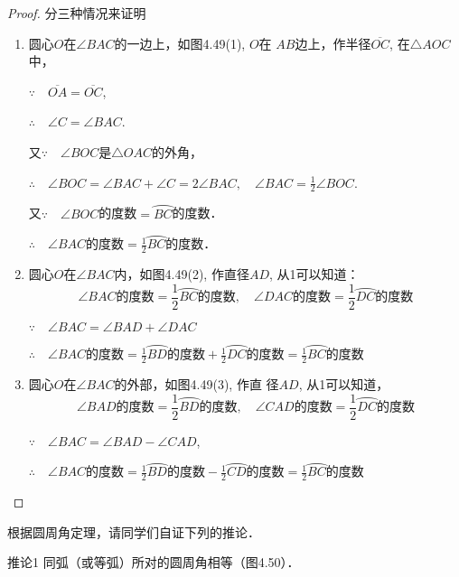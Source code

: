 \begin{proof}
分三种情况来证明
\begin{enumerate}
\item 圆心$O$在$\angle BAC$的一边上，如图4.49(1), $O$在
$AB$边上，作半径$\overline{OC}$, 在$\triangle AOC$中，

$\because \quad \overline{OA}=\overline{OC}$,

$\therefore\quad \angle C=\angle BAC$.

又$\because\quad \angle BOC$是$\triangle OAC$的外角，

$\therefore\quad \angle BOC=\angle BAC+\angle C=2\angle BAC,\quad \angle BAC=\frac{1}{2}\angle BOC$.

又$\because\quad \angle BOC$的度数$=\wideparen{BC}$的度数．

$\therefore\quad \angle BAC$的度数$=\frac{1}{2}\wideparen{BC}$的度数．

\item 圆心$O$在$\angle BAC$内，如图4.49(2), 
作直径$AD$, 从1可以知道：
\[\angle BAC\text{的度数}=\frac{1}{2}\wideparen{BC}\text{的度数},\quad \angle DAC\text{的度数}=\frac{1}{2}\wideparen{DC}\text{的度数}\]

$\because\quad \angle BAC=\angle BAD+\angle DAC$

$\therefore\quad \angle BAC\text{的度数}=\frac{1}{2}\wideparen{BD}\text{的度数}+\frac{1}{2}\wideparen{DC}\text{的度数}=\frac{1}{2}\wideparen{BC}\text{的度数}$

\item 圆心$O$在$\angle BAC$的外部，如图4.49(3), 作直
径$AD$, 从1可以知道，
\[\angle BAD\text{的度数}=\frac{1}{2}\wideparen{BD}\text{的度数},\quad \angle CAD\text{的度数}=\frac{1}{2}\wideparen{DC}\text{的度数}\]

$\because\quad \angle BAC=\angle BAD-\angle CAD$,

$\therefore\quad \angle BAC\text{的度数}=\frac{1}{2}\wideparen{BD}\text{的度数}-\frac{1}{2}\wideparen{CD}\text{的度数}=\frac{1}{2}\wideparen{BC}\text{的度数}$
\end{enumerate}
\end{proof}

根据圆周角定理，请同学们自证下列的推论．

\begin{blk}{推论1} 
同弧（或等弧）所对的圆周角相等（图4.50）．
\end{blk}

